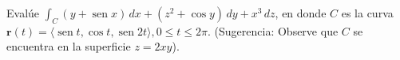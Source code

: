 \item Evalúe $\int_C (y + \operatorname{sen} x) \, dx + (z^2 + \cos y) \, dy + x^3 \, dz$, en donde $C$ es la curva $\mathbf{r}(t) = \langle \operatorname{sen} t, \cos t, \operatorname{sen} 2t \rangle, 0 \le t \le 2\pi$. (Sugerencia: Observe que $C$ se encuentra en la superficie $z = 2xy$).
